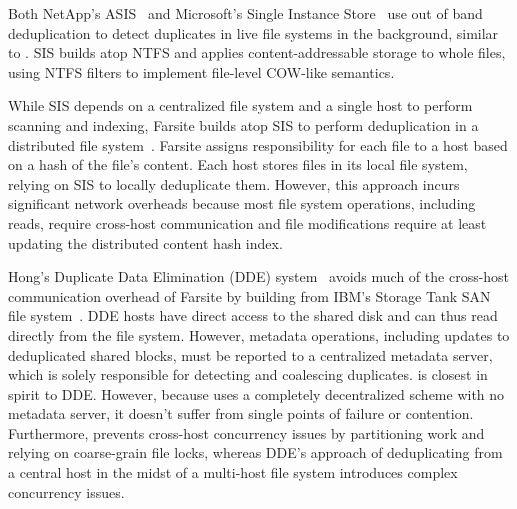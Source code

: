 Both NetApp's ASIS~\cite{netapp-asis-website} and Microsoft's Single
Instance Store~\cite{bolosky00sis} use out of band deduplication to
detect duplicates in live file systems in the background, similar to
\DeDe.  SIS builds atop NTFS and applies content-addressable storage
to whole files, using NTFS filters to implement file-level COW-like
semantics.

While SIS depends on a centralized file system and a single host to
perform scanning and indexing, Farsite builds atop SIS to
perform deduplication in a distributed file
system~\cite{douceur02farsitededup}.  Farsite assigns responsibility
for each file to a host based on a hash of the file's content.
Each host stores files in its local file
system, relying on SIS to locally deduplicate them.  However, this
approach incurs significant network overheads because most file
system operations, including reads, require cross-host communication and
file modifications require at least updating the distributed content
hash index.  

Hong's Duplicate Data Elimination (DDE) system~\cite{hong04sandedup}
avoids much of the cross-host communication overhead of Farsite by
building from IBM's Storage Tank SAN file
system~\cite{ibm-storage-tank}.  DDE hosts have direct access to
the shared disk and can thus read directly from the file system.
However, metadata operations, including updates to deduplicated shared
blocks, must be reported to a centralized metadata server, which is
solely responsible for detecting and coalescing duplicates.
\DeDe is closest in spirit to DDE.  However, because \DeDe uses a
completely decentralized scheme with no metadata server, it doesn't
suffer from single points of failure or contention.  Furthermore,
\DeDe prevents cross-host concurrency issues by partitioning work and
relying on coarse-grain file locks, whereas DDE's approach of
deduplicating from a central host in the midst of a multi-host file
system introduces complex concurrency issues.


